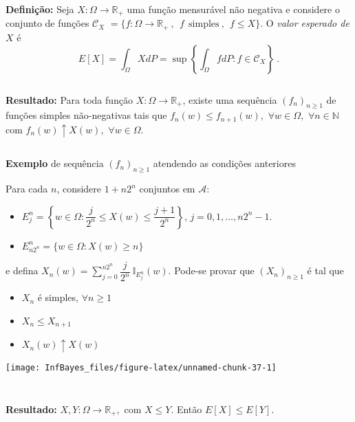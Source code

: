 \documentclass[
]{book}
\begin{document}
\(~\)

\(~\)

\textbf{Definição:} Seja \(X:\Omega\longrightarrow \mathbb{R}_+\) uma função mensurável não negativa e considere o conjunto de funções \(\mathcal{C}_X\) \(= \{ f:\Omega\longrightarrow \mathbb{R}_+~,~~f~~\text{simples}~,~~f \leq X\}\). O \emph{valor esperado de \(X\)} é
\[E[X]=\int_\Omega XdP=\sup\left\{\int_\Omega fdP: f\in \mathcal{C}_X\right\}~.\]

\(~\)

\textbf{Resultado:} Para toda função \(X:\Omega \longrightarrow \mathbb{R}_+\), existe uma sequência \((f_n)_{n\geq 1}\) de funções simples não-negativas tais que \(f_n(w)\leq f_{n+1}(w),\) \(\forall w \in \Omega,\) \(\forall n \in \mathbb{N}\) com \(f_n(w)\uparrow X(w),\) \(\forall w \in \Omega.\)

\(~\)

\textbf{Exemplo} de sequência \((f_n)_{n\geq 1}\) atendendo as condições anteriores

Para cada \(n\), considere \(1+n2^n\) conjuntos em \(\mathcal{A}:\)

\begin{itemize}
\item
  \(E_j^n = \left\{w \in \Omega: \dfrac{j}{2^n} \leq X(w) \leq \dfrac{j+1}{2^n} \right\}\), \(j = 0,1,\ldots,n2^n-1.\)
\item
  \(E_{n2^n}^n = \Big\{ w \in \Omega: X(w)\geq n \Big\}\)
\end{itemize}

e defina \(\displaystyle X_n(w) = \sum_{j=0}^{n2^n} \dfrac{j}{2^n} ~\mathbb{I}_{E_j^n}(w)\). Pode-se provar que \((X_n)_{n\geq 1}\) é tal que

\begin{itemize}
\item
  \(X_n\) é simples, \(\forall n \geq 1\)
\item
  \(X_n \leq X_{n+1}\)
\item
  \(X_{n}(w) \uparrow X(w)\)
\end{itemize}

\begin{center}\texttt{[image: InfBayes\_files/figure-latex/unnamed-chunk-37-1]} \end{center}

\(~\)

\(~\)

\textbf{Resultado:} \(X,Y: \Omega \longrightarrow\mathbb{R}_+,\) com \(X\leq Y\). Então \(E[X] \leq E[Y]\).
\end{document}
